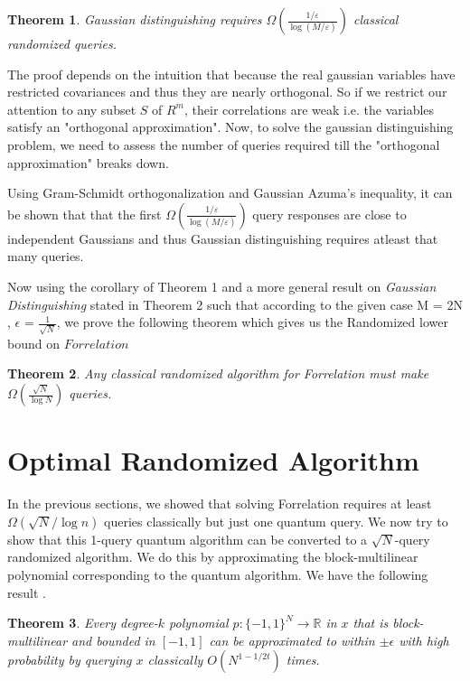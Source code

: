 \documentclass[12pt]{report}
\newtheorem{theorem}{Theorem}
\begin{document}
\begin{theorem}
Gaussian distinguishing requires $\Omega\left(\frac{1 / \varepsilon}{\log (M / \varepsilon)}\right)$ classical randomized queries.
\end{theorem}

The proof depends on the intuition that because the real gaussian variables have restricted covariances and thus they are nearly orthogonal. So if we restrict our attention to any subset $S$ of $R^{m}$, their correlations are weak i.e. the variables satisfy an "orthogonal approximation". Now, to solve the gaussian distinguishing problem, we need to assess the number of queries required till the "orthogonal approximation" breaks down.

Using Gram-Schmidt orthogonalization and Gaussian Azuma's inequality, it can be shown that that the first  $\Omega\left(\frac{1 / \varepsilon}{\log (M / \varepsilon)}\right)$ query responses are close to independent Gaussians and thus Gaussian distinguishing requires atleast that many queries.

Now using the corollary of Theorem 1 and a more general result on \textit{Gaussian Distinguishing} stated in Theorem 2 such that according to the given case M = 2N , $\epsilon$ = $\frac{1}{\sqrt{N}}$, we prove the following theorem which gives us the Randomized lower bound on $Forrelation$


\begin{theorem}
Any classical randomized algorithm for Forrelation must make $\Omega\left(\frac{\sqrt{N}}{\log N}\right)$ queries.
\end{theorem}








\section{Optimal Randomized Algorithm}
In the previous sections, we showed that solving Forrelation requires at least $\Omega(\sqrt{N}/\log n)$ queries classically but just one quantum query. We now try to show that this 1-query quantum algorithm can be converted to a $\sqrt{N}$-query randomized algorithm. We do this by approximating the block-multilinear polynomial corresponding to the quantum algorithm. We have the following result \cite{paper1}.

\begin{theorem}
Every degree-$k$ polynomial $p\colon \{-1,1\}^{N} \rightarrow \mathbb{R}$ in $x$ that is block-multilinear and bounded in $[-1,1]$ can be approximated to within $\pm \epsilon$ with high probability by querying $x$ classically $O\left(N^{1 - 1/2t}\right)$ times.
\end{theorem}
\end{document}
